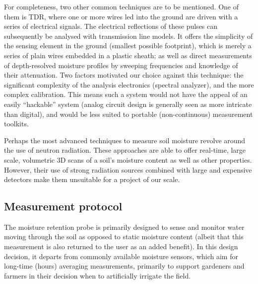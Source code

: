 For completeness, two other common techniques are to be mentioned. One of them is {\gls{TDR}}, where one or more wires led into the ground are driven with a series of electrical signals. The electrical reflections of these pulses can subsequently be analysed with transmission line models.\cite{coaxialmultiplexertimeevett1998}\cite{timedomainreflectrometrypettinellietal2002} It offers the simplicity of the sensing element in the ground (smallest possible footprint), which is merely a series of plain wires embedded in a plastic sheath; as well as direct measurements of depth-resolved moisture profiles by sweeping frequencies and knowledge of their attenuation. Two factors motivated our choice against this technique: the significant complexity of the analysis electronics (spectral analyzer), and the more complex calibration\cite{solutetransportwaterperssonetal2000}\cite{timedomainreflectrometrynicholetal2003}. This means such a system would not have the appeal of an easily \enquote{hackable} system (analog circuit design is generally seen as more intricate than digital), and would be less suited to portable (non-continuous) measurement toolkits.

Perhaps the most advanced techniques to measure soil moisture revolve around the {use of neutron radiation}.\cite{neutronprobesoilhodnett1986} These approaches are able to offer real-time, large scale, volumetric 3D scans of a soil's moisture content as well as other properties.\cite{intraseasonaldynamicssoilhupetetal2002}\cite{influenceaccessholeabeele1979} However, their use of strong radiation sources combined with large and expensive detectors make them unsuitable for a project of our scale.

\subsection{Measurement protocol}
\label{smeasurementprotocol}


The moisture retention probe is primarily designed to sense and monitor water moving through the soil as opposed to static moisture content (albeit that this measurement is also returned to the user as an added benefit). In this design decision, it departs from commonly available moisture sensors, which aim for long-time (hours) averaging measurements, primarily to support gardeners and farmers in their decision when to artificially irrigate the field.

